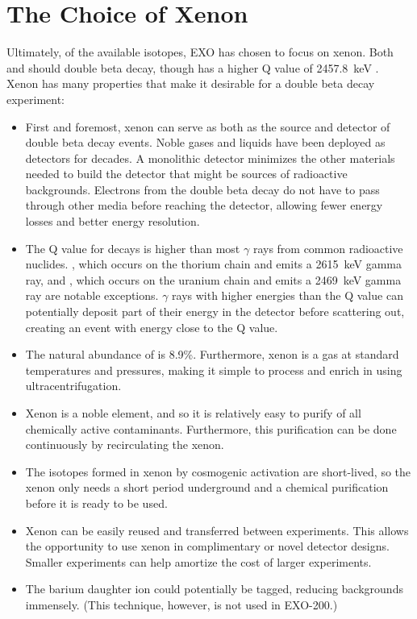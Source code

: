 \documentclass[herrin-thesis.tex]{subfiles}
\begin{document}
\section{The Choice of Xenon}
Ultimately, of the available isotopes, EXO has chosen to focus on xenon. Both  and  should double beta decay, though  has a higher Q value of \SI{2457.8}{\keV} \cite{Redshaw:2007cr}. Xenon has many properties that make it desirable for a double beta decay experiment:
\begin{itemize}
\item First and foremost, xenon can serve as both as the source and detector of double beta decay events. Noble gases and liquids have been deployed as detectors for decades. A monolithic detector minimizes the other materials needed to build the detector that might be sources of radioactive backgrounds. Electrons from the double beta decay do not have to pass through other media before reaching the detector, allowing fewer energy losses and better energy resolution.
\item The Q value for  decays is higher than most \(\gamma\) rays from common radioactive nuclides. , which occurs on the thorium chain and emits a \SI{2615}{\keV} gamma ray, and , which occurs on the uranium chain and emits a \SI{2469}{\keV} gamma ray are notable exceptions. \(\gamma\) rays with higher energies than the Q value can potentially deposit part of their energy in the detector before scattering out, creating an event with energy close to the Q value.
\item The natural abundance of  is 8.9\%. Furthermore, xenon is a gas at standard temperatures and pressures, making it simple to process and enrich in  using ultracentrifugation.
\item Xenon is a noble element, and so it is relatively easy to purify of all chemically active contaminants. Furthermore, this purification can be done continuously by recirculating the xenon.
\item The isotopes formed in xenon by cosmogenic activation are short-lived, so the xenon only needs a short period underground and a chemical purification before it is ready to be used.
\item Xenon can be easily reused and transferred between experiments. This allows the opportunity to use xenon in complimentary or novel detector designs. Smaller experiments can help amortize the cost of larger experiments.
\item The barium daughter ion could potentially be tagged, reducing backgrounds immensely. (This technique, however, is not used in EXO-200.)
\end{itemize}
\end{document}
